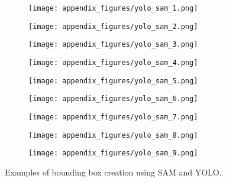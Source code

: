 \begin{figure}
    \centering
    
    \begin{subfigure}{0.32\textwidth}
        \centering
        \texttt{[image: appendix\_figures/yolo\_sam\_1.png]}
        \caption{}
        \label{fig:sub1}
    \end{subfigure}
    \hfill
    \begin{subfigure}{0.32\textwidth}
        \centering
        \texttt{[image: appendix\_figures/yolo\_sam\_2.png]}
        \caption{}
        \label{fig:sub2}
    \end{subfigure}
    \hfill
    \begin{subfigure}{0.32\textwidth}
        \centering
        \texttt{[image: appendix\_figures/yolo\_sam\_3.png]}
        \caption{}
        \label{fig:sub3}
    \end{subfigure}
    
    \vspace{0.1cm}
    
    \begin{subfigure}{0.32\textwidth}
        \centering
        \texttt{[image: appendix\_figures/yolo\_sam\_4.png]}
        \caption{}
        \label{fig:sub4}
    \end{subfigure}
    \hfill
    \begin{subfigure}{0.32\textwidth}
        \centering
        \texttt{[image: appendix\_figures/yolo\_sam\_5.png]}
        \caption{}
        \label{fig:sub5}
    \end{subfigure}
    \hfill
    \begin{subfigure}{0.32\textwidth}
        \centering
        \texttt{[image: appendix\_figures/yolo\_sam\_6.png]}
        \caption{}
        \label{fig:sub6}
    \end{subfigure}
    
    \vspace{0.1cm}
    
    \begin{subfigure}{0.32\textwidth}
        \centering
        \texttt{[image: appendix\_figures/yolo\_sam\_7.png]}
        \caption{}
        \label{fig:sub7}
    \end{subfigure}
    \hfill
    \begin{subfigure}{0.32\textwidth}
        \centering
        \texttt{[image: appendix\_figures/yolo\_sam\_8.png]}
        \caption{}
        \label{fig:sub8}
    \end{subfigure}
    \hfill
    \begin{subfigure}{0.32\textwidth}
        \centering
        \texttt{[image: appendix\_figures/yolo\_sam\_9.png]}
        \caption{}
        \label{fig:sub9}
    \end{subfigure}
    
    \caption{Examples of bounding box creation using SAM and YOLO.}
    \label{fig:sam_yolo_examples}
\end{figure}


